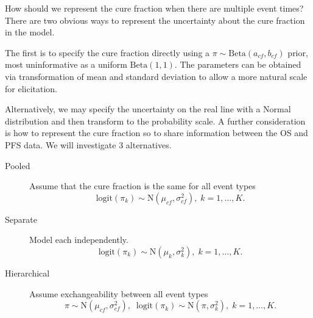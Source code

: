 \documentclass[AMA,STIX1COL]{WileyNJD-v2}
\begin{document}
How should we represent the cure fraction when there are multiple event times?
There are two obvious ways to represent the uncertainty about the cure fraction in the model.

The first is to specify the cure fraction directly using a
$\pi \sim \text{Beta}(a_{cf}, b_{cf})$ prior, most uninformative as a uniform
$\text{Beta}(1,1)$. The parameters can be obtained via transformation of mean
and standard deviation to allow a more natural scale for elicitation.

Alternatively, we may specify the uncertainty on the real line with a
Normal distribution and then transform to the probability scale.
A further consideration is how to represent the cure fraction so to
share information between the OS and PFS data. We will investigate 3
alternatives.

\begin{description}
    \item[Pooled] Assume that the cure fraction is the same for all event types
    $$
    \text{logit}(\pi_k) \sim \text{N}(\mu_{cf}, \sigma_{cf}^2), \; k = 1, \ldots, K.
    $$
    \item[Separate] Model each independently.
    $$
    \text{logit}(\pi_k) \sim \text{N}(\mu_k, \sigma_k^2), \; k = 1, \ldots, K.
    $$
    \item[Hierarchical] Assume exchangeability between all event types
    $$
    \pi \sim \text{N}(\mu_{cf}, \sigma_{cf}^2), \;\;  
    \text{logit}(\pi_k) \sim \text{N}(\pi, \sigma_k^2), \; k = 1, \ldots, K.  
    $$
\end{description}

\end{document}
